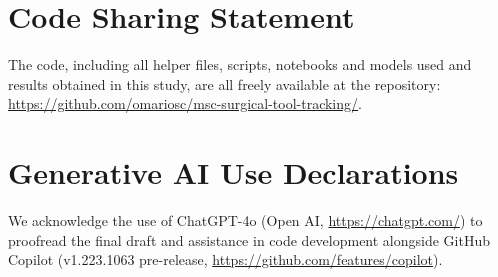 \documentclass[sigconf, screen, review]{acmart}
\begin{document}
\section*{Code Sharing Statement}

The code, including all helper files, scripts, notebooks and models used and results obtained in this study, are all freely available at the repository: \url{https://github.com/omariosc/msc-surgical-tool-tracking/}.

\section*{Generative AI Use Declarations}

We acknowledge the use of ChatGPT-4o (Open AI, \url{https://chatgpt.com/}) to proofread the final draft and assistance in code development alongside GitHub Copilot (v1.223.1063 pre-release, \url{https://github.com/features/copilot}).
% 
\end{document}

